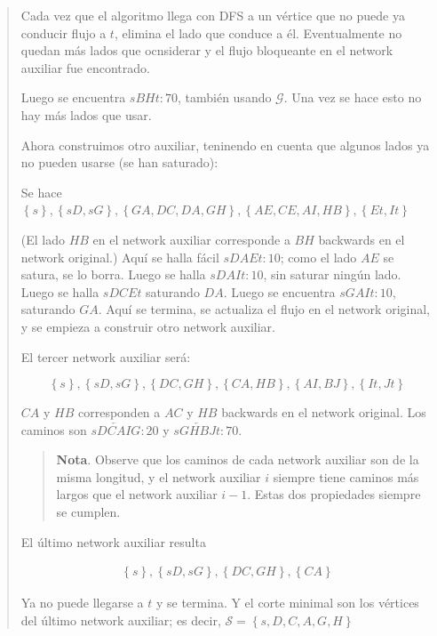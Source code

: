 \documentclass[a4paper]{article}
\begin{document}
\begin{quote}
Cada vez que el algoritmo llega con DFS a un vértice que no puede ya conducir
flujo a $t$, elimina el lado que conduce a él. Eventualmente no quedan más
lados que ocnsiderar y el flujo bloqueante en el network auxiliar fue encontrado.

Luego se encuentra $sBHt : 70$, también usando $\mathscr{G}$. Una vez se hace esto no hay más lados que usar. 

Ahora construimos otro auxiliar, teninendo en cuenta que algunos lados ya no pueden usarse (se han saturado):

Se hace $\left\{ s \right\}, \left\{ sD, sG \right\}, \left\{ GA,DC, DA, GH \right\}, \left\{ AE, CE, AI, HB \right\}, \left\{ Et, It \right\}    $

(El lado $HB$ en el network auxiliar corresponde a $BH$ backwards en el network
original.) Aquí se halla fácil $sDAEt : 10$; como el lado $AE$ se satura, se lo
borra. Luego se halla $sDAIt : 10$, sin saturar ningún lado. Luego se halla
$sDCEt$ saturando $DA$. Luego se encuentra $sGAIt : 10$, saturando $GA$. Aquí
se termina, se actualiza el flujo en el network original, y se empieza a
construir otro network auxiliar.

El tercer network auxiliar será: 

$$\left\{ s \right\}, \left\{ sD, sG \right\}, \left\{ DC, GH \right\},
\left\{CA, HB \right\}, \left\{ AI, BJ \right\}, \left\{ It, Jt \right\}    $$

$CA$ y $HB$ corresponden a $AC$ y $HB$ backwards en el network original. Los
caminos son $sD\overleftarrow{CA}IG : 20$ y $sG \overleftarrow{HB}Jt : 70$.


\small
\begin{quote}

\textbf{Nota}. Observe que los caminos de cada network auxiliar son de la misma
longitud, y el network auxiliar $i$ siempre tiene caminos más largos que el
network auxiliar $i - 1$. Estas dos propiedades siempre se cumplen.

\end{quote}
\normalsize

El último network auxiliar resulta 

\begin{align*}
    \left\{ s \right\}, \left\{ sD, sG \right\}  , \left\{ DC, GH \right\} , \left\{ CA \right\} 
\end{align*}

Ya no puede llegarse a $t$ y se termina. Y el corte minimal son los vértices
del último network auxiliar; es decir, $\mathcal{S} = \left\{ s, D, C, A, G, H
\right\} $

\end{quote}
\normalsize
\end{document}
